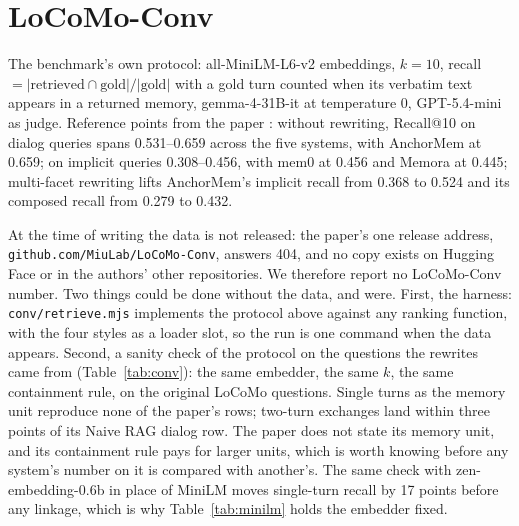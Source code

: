 \documentclass[11pt]{article}
\begin{document}
\section{LoCoMo-Conv}
\label{sec:conv}

The benchmark's own protocol: all-MiniLM-L6-v2 embeddings, $k=10$, recall
$= |\text{retrieved} \cap \text{gold}|/|\text{gold}|$ with a gold turn
counted when its verbatim text appears in a returned memory, gemma-4-31B-it
at temperature 0, GPT-5.4-mini as judge. Reference points from the paper
\cite{locomoconv}: without rewriting, Recall@10 on dialog queries spans
0.531--0.659 across the five systems, with AnchorMem at 0.659; on implicit
queries 0.308--0.456, with mem0 at 0.456 and Memora at 0.445; multi-facet
rewriting lifts AnchorMem's implicit recall from 0.368 to 0.524 and its
composed recall from 0.279 to 0.432.

At the time of writing the data is not released: the paper's one release
address, \texttt{github.com/MiuLab/LoCoMo-Conv}, answers 404, and no copy
exists on Hugging Face or in the authors' other repositories. We therefore
report no LoCoMo-Conv number. Two things could be done without the data,
and were. First, the harness: \texttt{conv/retrieve.mjs} implements the
protocol above against any ranking function, with the four styles as a
loader slot, so the run is one command when the data appears. Second, a
sanity check of the protocol on the questions the rewrites came from
(Table~\ref{tab:conv}): the same embedder, the same $k$, the same
containment rule, on the original LoCoMo questions. Single turns as the
memory unit reproduce none of the paper's rows; two-turn exchanges land
within three points of its Naive RAG dialog row. The paper does not state
its memory unit, and its containment rule pays for larger units, which is
worth knowing before any system's number on it is compared with another's.
The same check with zen-embedding-0.6b in place of MiniLM moves single-turn
recall by 17 points before any linkage, which is why Table~\ref{tab:minilm}
holds the embedder fixed.

\begin{table}[t]
\centering
\footnotesize

\caption{LoCoMo-Conv's retrieval protocol on the original LoCoMo questions,
the closest public proxy while the rewrites are unreleased. R@10 by memory
unit, all-MiniLM-L6-v2. The paper's Naive RAG row is given for scale; it is
not the same question set and is not compared.}
\label{tab:conv}
\end{table}
\end{document}
